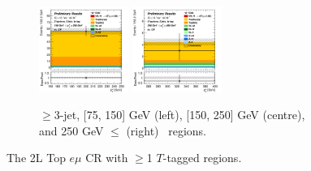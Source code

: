 \begin{figure}[h!]
\begin{subfigure}[b]{\textwidth}
        \includegraphics[width=0.32\textwidth]{Images/VH/Own_fit/prefit_VHcc/Region_distpTV_BMax250_BMin150_Dtopemucr_J3_TTypeta_T2_L2_Y6051_Prefit.png}
        \includegraphics[width=0.32\textwidth]{Images/VH/Own_fit/prefit_VHcc/Region_distpTV_BMax400_BMin250_Dtopemucr_J3_TTypeta_T2_L2_Y6051_Prefit.png}
        \caption{$\geq$3-jet, [75, 150] GeV (left), [150, 250] GeV (centre), and 250  GeV $\leq$ (right) \ptv\ regions.}
        \label{fig:plots_VHcc_2L_topCRemu_3J}
    \end{subfigure}
    \caption{The 2L Top $e\mu$ CR with $\geq$1 $T$-tagged regions.}
    \label{fig:plots_VHcc_2L_topCRemu}
\end{figure}
